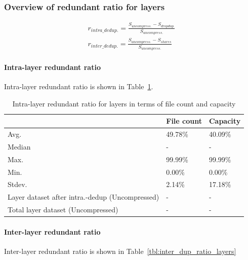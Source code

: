 \subsubsection{Overview of redundant ratio for layers}

\begin{eqnarray}
r_{intra\_dedup.} = \frac{S_{uncompress.} - S_{dropdup.}}{S_{uncompress.}} \\
r_{inter\_dedup.} = \frac{S_{uncompress.} - S_{shares}}{S_{uncompress.}}
\end{eqnarray}

\paragraph{Intra-layer redundant ratio} Intra-layer redundant ratio is shown in Table~\ref{tbl:intra_dup_ratio_layers}.

\begin{table} 
	\centering 
	\scriptsize  
	\caption{Intra-layer redundant ratio for layers in terms of file count and capacity} \label{tbl:intra_dup_ratio_layers} 
	\begin{tabular}{|l|l|l|}%
		\hline 
		& File count & Capacity \\
		\hline
		Avg. & 49.78\% & 40.09\%\\
		\hline
		Median & - & - \\
		\hline
		Max. & 99.99\% & 99.99\%\\
		\hline
		Min.  & 0.00\%  & 0.00\%\\
		\hline
		Stdev.  &  2.14\% & 17.18\%\\
		\hline
		Layer dataset after intra.-dedup (Uncompressed) & -  & -\\
		\hline 
		Total layer dataset (Uncompressed) &  -	& -\\
		\hline 
	\end{tabular} 
\end{table}

\paragraph{Inter-layer redundant ratio} Inter-layer redundant ratio is shown in Table~\ref{tbl:inter_dup_ratio_layers}

